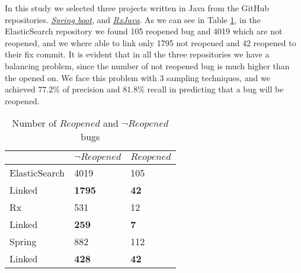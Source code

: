 \documentclass[sigconf,review]{acmart}
\begin{document}
 In this study we selected three projects written in Java from the GitHub repositories. \href{https://github.com/spring-projects/spring-boot}{\emph{Spring boot}}, and \href{https://github.com/ReactiveX/RxJava}{\emph{RxJava}}. As we can see in Table \ref{tab:linked},  in the ElasticSearch repository we found 105 reopened bug and 4019 which are not reopened, and we where able to link only 1795 not reopened and 42 reopened to their fix commit. It is evident that in all the three repositories we have a balancing problem, since the number of not reopened bug is much higher than the opened on. We face this problem with 3 sampling techniques, and we achieved $77.2\%$ of precision and $81.8\%$ recall in predicting that a  bug will be reopened.

\begin{table}
\caption{Number of $Reopened$ and $\neg Reopened$ bugs} \label{tab:linked}
\begin{tabular}{lll}
\hline
\hline
\multicolumn{1}{c}{}
& \multicolumn{1}{c}{$\neg Reopened$}
&	\multicolumn{1}{c}{$ Reopened$}    \\    

\hline
ElasticSearch      & 4019 & 105     \\
Linked				&\textbf{1795} &\textbf{42}\\ 
\hline
Rx      			& 531 & 12     \\
Linked				&\textbf{259} &\textbf{7}\\
\hline
Spring      		& 882 & 112     \\
Linked				&\textbf{428} &\textbf{42}\\
\hline
\hline
\end{tabular}
\end{table}



  
\end{document}
